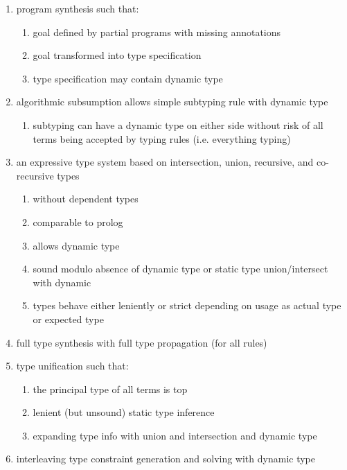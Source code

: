 \documentclass[sigplan,screen]{acmart}
\begin{document}
\begin{enumerate}
  \item program synthesis such that:
    \begin{enumerate}
      \item goal defined by partial programs with missing annotations  
      \item goal transformed into type specification 
      \item type specification may contain dynamic type  
    \end{enumerate}
  \item algorithmic subsumption allows simple subtyping rule with dynamic type
    \begin{enumerate}
      \item subtyping can have a dynamic type on either side without risk of   
        all terms being accepted by typing rules (i.e. everything typing)
    \end{enumerate}
  \item an expressive type system 
    based on intersection, union, recursive, and co-recursive types
    \begin{enumerate}
      \item without dependent types 
      \item comparable to prolog 
      \item allows dynamic type 
      \item sound modulo absence of dynamic type 
        or static type union/intersect with dynamic
      \item types behave either leniently or strict depending on usage as actual type or expected type
    \end{enumerate}
  \item full type synthesis with full type propagation (for all rules)
  \item type unification such that: 
    \begin{enumerate}
      \item the principal type of all terms is top
      \item lenient (but unsound) static type inference
      \item expanding type info with union and intersection and dynamic type
    \end{enumerate}
  \item interleaving type constraint generation and solving with dynamic type 
\end{enumerate}
\end{document}
